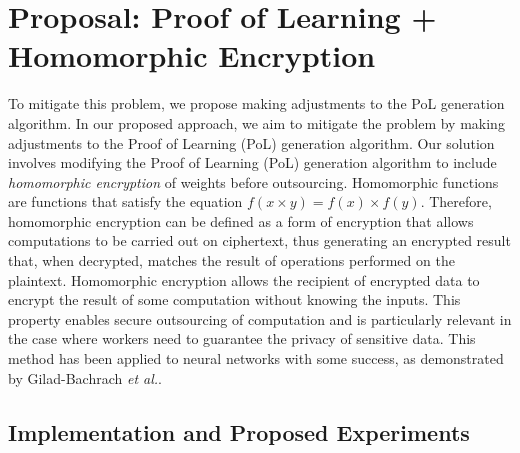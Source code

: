 \documentclass[11pt]{article}
\begin{document}
\section*{Proposal: Proof of Learning + Homomorphic Encryption}

To mitigate this problem, we propose making adjustments to the PoL generation algorithm. In our proposed approach, we aim to mitigate the problem by making adjustments to the Proof of Learning (PoL) generation algorithm. Our solution involves modifying the Proof of Learning (PoL) generation algorithm to include \textit{homomorphic encryption} of weights before outsourcing. Homomorphic functions are functions that satisfy the equation $f(x \times y) = f(x) \times f(y)$. Therefore, homomorphic encryption can be defined as a form of encryption that allows computations to be carried out on ciphertext, thus generating an encrypted result that, when decrypted, matches the result of operations performed on the plaintext. Homomorphic encryption allows the recipient of encrypted data to encrypt the result of some computation without knowing the inputs. This property enables secure outsourcing of computation and is particularly relevant in the case where workers need to guarantee the privacy of sensitive data. This method has been applied to neural networks with some success, as demonstrated by Gilad-Bachrach \textit{et al.}\cite{gilad2016cryptonets}.

\subsection*{Implementation and Proposed Experiments}
\end{document}

